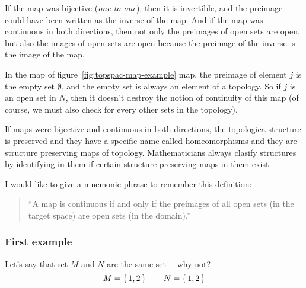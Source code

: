   If the map was bijective (\emph{one-to-one}), then it is invertible, and the preimage
  could have been written as the inverse of the map. And if the map was continuous in
  both directions,
  then not only the preimages of open sets are open, but also the images of open sets
  are open because the preimage of the inverse is the image of the map.

  In the map of figure~\ref{fig:topspac-map-example} map, the preimage of element $j$\/
  is the empty set $\emptyset$, and the empty set is always an element of a topology.
  So if $j$\/ is an open set in $N$, then it doesn't destroy the notion of continuity of
  this map (of course, we must also check for every other sets in the topology).

  If maps were bijective and continuous in both directions, the topologica structure is
  preserved and they have a specific name called homeomorphisms and they are structure
  preserving maps of topology. Mathematicians always clasify structures by identifying
  in them if certain structure preserving maps in them exist.

  I would like to give a mnemonic phrase to remember this definition:
  \begin{quote}
    ``A map is continuous if and only if the preimages of all open sets (in the target
    space) are open sets (in the domain).''
  \end{quote}
 
  \subsubsection{First example}
  Let's say that set $M$ and $N$ are the same set ---why not?---
  \[
    M = \set{1, 2}
    \hspace{2em}
    N = \set{1,2}
  \]

